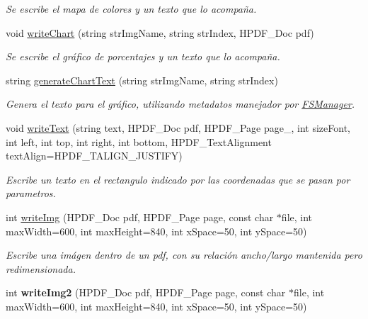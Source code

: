 \begin{DoxyCompactItemize}
\begin{DoxyCompactList}\small\item\em Se escribe el mapa de colores y un texto que lo acompaña. \end{DoxyCompactList}\item 
void \mbox{\hyperlink{classRedaction_af897cc53c7d60685232fe19dd76d0d9f}{write\+Chart}} (string str\+Img\+Name, string str\+Index, H\+P\+D\+F\+\_\+\+Doc pdf)
\begin{DoxyCompactList}\small\item\em Se escribe el gráfico de porcentajes y un texto que lo acompaña. \end{DoxyCompactList}\item 
string \mbox{\hyperlink{classRedaction_a466ce7f7f8b2a4ec810b2da9c7832f26}{generate\+Chart\+Text}} (string str\+Img\+Name, string str\+Index)
\begin{DoxyCompactList}\small\item\em Genera el texto para el gráfico, utilizando metadatos manejador por \mbox{\hyperlink{classFSManager}{F\+S\+Manager}}. \end{DoxyCompactList}\item 
void \mbox{\hyperlink{classRedaction_ab5716b51790373ff2726286e1d02d73d}{write\+Text}} (string text, H\+P\+D\+F\+\_\+\+Doc pdf, H\+P\+D\+F\+\_\+\+Page page\+\_, int size\+Font, int left, int top, int right, int bottom, H\+P\+D\+F\+\_\+\+Text\+Alignment text\+Align=H\+P\+D\+F\+\_\+\+T\+A\+L\+I\+G\+N\+\_\+\+J\+U\+S\+T\+I\+FY)
\begin{DoxyCompactList}\small\item\em Escribe un texto en el rectangulo indicado por las coordenadas que se pasan por parametros. \end{DoxyCompactList}\item 
int \mbox{\hyperlink{classRedaction_a3236e2af6e29f073fa487056af998924}{write\+Img}} (H\+P\+D\+F\+\_\+\+Doc pdf, H\+P\+D\+F\+\_\+\+Page page, const char $\ast$file, int max\+Width=600, int max\+Height=840, int x\+Space=50, int y\+Space=50)
\begin{DoxyCompactList}\small\item\em Escribe una imágen dentro de un pdf, con su relación ancho/largo mantenida pero redimensionada. \end{DoxyCompactList}\item 
\mbox{\label{classRedaction_aed4dc98baf261fd3864b083d901aeba7}} 
int {\bfseries write\+Img2} (H\+P\+D\+F\+\_\+\+Doc pdf, H\+P\+D\+F\+\_\+\+Page page, const char $\ast$file, int max\+Width=600, int max\+Height=840, int x\+Space=50, int y\+Space=50)

\end{DoxyCompactItemize}

